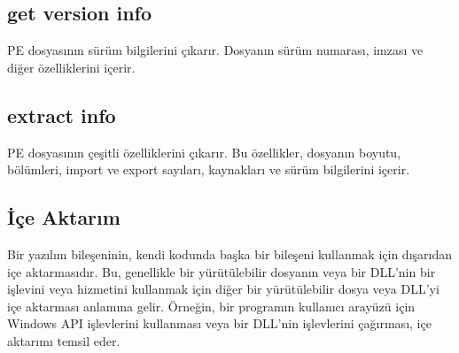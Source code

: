 \documentclass{article}
\begin{document}
\subsection{get version info}
PE dosyasının sürüm bilgilerini çıkarır. Dosyanın sürüm numarası, imzası ve diğer özelliklerini içerir.
\subsection{extract info}
 PE dosyasının çeşitli özelliklerini çıkarır. Bu özellikler, dosyanın boyutu, bölümleri, import ve export sayıları, kaynakları ve sürüm bilgilerini içerir.
 \subsection{İçe Aktarım}
 Bir yazılım bileşeninin, kendi kodunda başka bir bileşeni kullanmak için dışarıdan içe aktarmasıdır. Bu, genellikle bir yürütülebilir dosyanın veya bir DLL'nin bir işlevini veya hizmetini kullanmak için diğer bir yürütülebilir dosya veya DLL'yi içe aktarması anlamına gelir. Örneğin, bir programın kullanıcı arayüzü için Windows API işlevlerini kullanması veya bir DLL'nin işlevlerini çağırması, içe aktarımı temsil eder.
\end{document}
